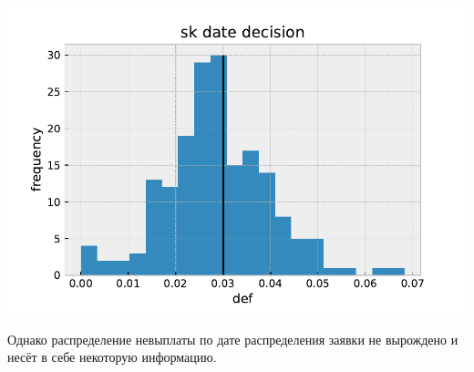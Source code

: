 \documentclass[russian, 10pt]{beamer}
\begin{document}
\begin{frame}

\includegraphics[scale=0.7]{images/sk_date_decision.pdf}

Однако распределение невыплаты по дате распределения заявки не вырождено и несёт в себе некоторую информацию.

\end{frame}
\end{document}
